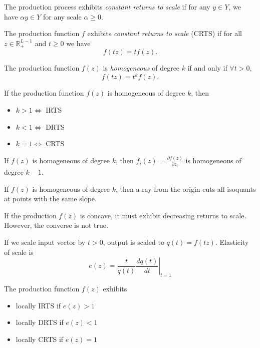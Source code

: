 \documentclass[12pt,fleqn]{book} %
\begin{document}
\begin{definition}
	The	production process exhibits \emph{constant returns to scale} if for any $y\in Y$, we have $\alpha y\in Y$ for any scale $\alpha\ge0$. 
	
	The	production function $f$ exhibits \emph{constant returns to scale} (CRTS) if for all $z\in\mathbb{R}_+^{L-1}$ and $t\ge0$ we have
	\[
	f(tz)=tf(z). 
	\]	
\end{definition}

\begin{definition}[Homogeneity]
	The	production function $f(z)$ is \emph{homogeneous} of degree $k$ if and only if $\forall t > 0$,
	\[
	f (tz) = t^k f (z).
	\]	
\end{definition}

\begin{proposition}
	If the production function $f(z)$ is homogeneous of degree $k$, then
	\begin{itemize}
		\item $k > 1 \iff$ IRTS
		\item $k < 1 \iff$ DRTS
		\item $k = 1 \iff$ CRTS
	\end{itemize}

\end{proposition}

\begin{proposition}
	If $f(z)$ is homogeneous of degree $k$, then $f_i(z)=\frac{\partial f(z)}{\partial z_i}$ is homogeneous of degree $k-1$.
\end{proposition}

\begin{proposition}
	If $f(z)$ is homogeneous of degree $k$, then a ray from the origin cuts all isoquants at points with the same slope.
\end{proposition}

\begin{proposition}
	If the production $f(z)$ is concave, it must exhibit decreasing returns to scale. However, the converse is not true.
\end{proposition}


\begin{definition}
	If we scale input vector by $t > 0$, output is scaled to $q(t)=f (tz)$. Elasticity of scale is
	\[
	e(z)=\left.\frac{t}{q(t)}\frac{dq(t)}{dt}\right|_{t=1}
	\]	
\end{definition}


\begin{definition}
	The	production function $f(z)$ exhibits
	\begin{itemize}
	\item locally IRTS if $e(z) > 1$
	\item locally DRTS if $e(z) < 1$	
	\item locally CRTS if $e(z) = 1$
	\end{itemize}
\end{definition}
\end{document}
